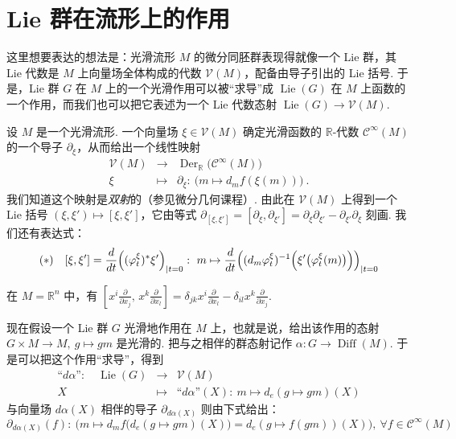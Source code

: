 \section{Lie 群在流形上的作用}\label{sec:lie-1-8}

这里想要表达的想法是：光滑流形 $M$ 的微分同胚群表现得就像一个 Lie 群，其 Lie 代数是 $M$ 上向量场全体构成的代数 $\mathcal V(M)$，配备由导子引出的 Lie 括号. 于是，Lie 群 $G$ 在 $M$ 上的一个光滑作用可以被``求导''成 $\operatorname{Lie}(G)$ 在 $M$ 上函数的一个作用，而我们也可以把它表述为一个 Lie 代数态射 $\operatorname{Lie}(G)\longrightarrow\mathcal V(M)$.

\begin{numpara}\label{np:lie-1-8-1}
设 $M$ 是一个光滑流形. 一个向量场 $\xi\in\mathcal V(M)$ 确定光滑函数的 $\mathbb R$-代数 $\mathcal C^{\infty}(M)$ 的一个导子 $\partial_{\xi}$，从而给出一个线性映射
\[
\begin{array}{rcl}
\mathcal V(M) & \longrightarrow & \operatorname{Der}_{\mathbb R}\bigl(\mathcal C^{\infty}(M)\bigr)\\[2pt]
\xi & \longmapsto & \partial_{\xi}:\ \bigl(m\mapsto d_{m}f(\xi(m))\bigr)\ .
\end{array}
\]
我们知道这个映射是\emph{双射}的（参见微分几何课程）. 由此在 $\mathcal V(M)$ 上得到一个 Lie 括号 $(\xi,\xi')\mapsto[\xi,\xi']$，它由等式 $\partial_{[\xi,\xi']}=[\partial_{\xi},\partial_{\xi'}]=\partial_{\xi}\partial_{\xi'}-\partial_{\xi'}\partial_{\xi}$ 刻画. 我们还有表达式：
\[
(*)\quad [\xi,\xi']=\frac{d}{dt}\Bigl((\varphi^{\xi}_{t})^{*}\xi'\Bigr)_{|t=0}:\ m\mapsto\frac{d}{dt}\Bigl((d_{m}\varphi^{\xi}_{t})^{-1}\Bigl(\xi'\bigl(\varphi^{\xi}_{t}(m)\bigr)\Bigr)\Bigr)_{|t=0}
\]
\end{numpara}

\begin{example*}
在 $M=\mathbb R^{n}$ 中，有 $[x^{i}\frac{\partial}{\partial x_{j}},\,x^{k}\frac{\partial}{\partial x_{l}}]=\delta_{jk}x^{i}\frac{\partial}{\partial x_{l}}-\delta_{il}x^{k}\frac{\partial}{\partial x_{j}}$.
\end{example*}

\begin{numpara}[光滑作用的导数]\label{np:lie-1-8-2}
现在假设一个 Lie 群 $G$ 光滑地作用在 $M$ 上，也就是说，给出该作用的态射 $G\times M\longrightarrow M,\ g\mapsto gm$ 是光滑的. 把与之相伴的群态射记作 $\alpha:G\longrightarrow\operatorname{Diff}(M)$. 于是可以把这个作用``求导''，得到
\[
\begin{array}{rcl}
\text{``}d\alpha\text{''}:\quad\operatorname{Lie}(G) & \longrightarrow & \mathcal V(M)\\[2pt]
X & \longmapsto & \text{``}d\alpha\text{''}(X):\ m\mapsto d_{e}(g\mapsto gm)(X)
\end{array}
\]
与向量场 $d\alpha(X)$ 相伴的导子 $\partial_{d\alpha(X)}$ 则由下式给出：
\[
\partial_{d\alpha(X)}(f):\ \bigl(m\mapsto d_{m}f\bigl(d_{e}(g\mapsto gm)(X)\bigr)=d_{e}(g\mapsto f(gm))(X)\bigr),\ \forall f\in\mathcal C^{\infty}(M)
\]
\end{numpara}


